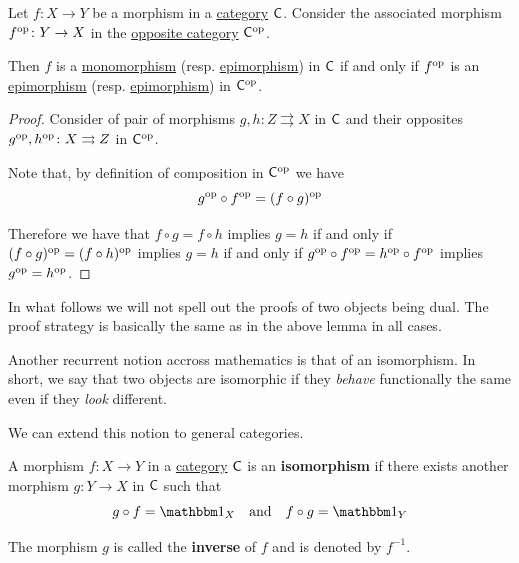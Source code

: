 \documentclass[../../main]{subfiles}
\begin{document}
\begin{lemma}
  Let \(f\colon X \to Y\) be a morphism in a \hyperref[def:category]{category} \(\mathsf{C}\).
  Consider the associated morphism \(f^{\operatorname*{op}}\colon Y \to X\) in the \hyperref[def:opposite-category]{opposite category} \(\mathsf{C}^{\operatorname*{op}}\).

  Then \(f\) is a \hyperref[def:mono-epi-morphism]{monomorphism} (resp. \hyperref[def:mono-epi-morphism]{epimorphism}) in \(\mathsf{C}\) if and only if \(f^{\operatorname*{op}}\) is an \hyperref[def:mono-epi-morphism]{epimorphism} (resp. \hyperref[def:mono-epi-morphism]{epimorphism}) in \(\mathsf{C}^{\operatorname*{op}}\).
\end{lemma}
\begin{proof}
  Consider of pair of morphisms \(g, h\colon Z \rightrightarrows X\) in \(\mathsf{C}\) and their opposites \(g^{\operatorname*{op}}, h^{\operatorname*{op}}\colon X \rightrightarrows Z\) in \(\mathsf{C}^{\operatorname*{op}}\).

  Note that, by definition of composition in \(\mathsf{C}^{\operatorname*{op}}\) we have
  \begin{equation*}
    g^{\operatorname*{op}} \circ f^{\operatorname*{op}} = (f \circ g)^{\operatorname*{op}}
  \end{equation*}

  Therefore we have that \(f \circ g = f \circ h\) implies \(g = h\) if and only if \((f \circ g)^{\operatorname*{op}} = (f \circ h)^{\operatorname*{op}}\) implies \(g = h\) if and only if \(g^{\operatorname*{op}} \circ f^{\operatorname*{op}} = h^{\operatorname*{op}} \circ f^{\operatorname*{op}}\) implies \(g^{\operatorname*{op}} = h^{\operatorname*{op}}\).
\end{proof}

\begin{remark}
  In what follows we will not spell out the proofs of two objects being dual.
  The proof strategy is basically the same as in the above lemma in all cases.
\end{remark}

Another recurrent notion accross mathematics is that of an isomorphism.
In short, we say that two objects are isomorphic if they \textit{behave} functionally the same even if they \textit{look} different.

We can extend this notion to general categories.
\begin{definition}[Isomorphism]\label{def:categorical-isomorphism}
  A morphism \(f\colon X \to Y\) in a \hyperref[def:category]{category} \(\mathsf{C}\) is an \textbf{isomorphism} if there exists another morphism \(g\colon Y \to X\) in \(\mathsf{C}\) such that
  \begin{equation*}
    g \circ f = \id_X \quad \text{and} \quad f \circ g = \id_Y
  \end{equation*}
  
  The morphism \(g\) is called the \textbf{inverse} of \(f\) and is denoted by \(f^{-1}\).
\end{definition}
\end{document}
